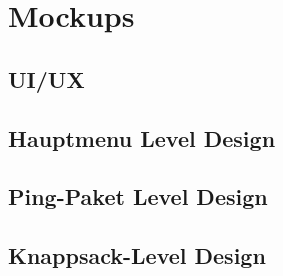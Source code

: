 \chapter{Mockups}

\newcommand*{\checkbox}{{\fboxsep 1pt%
\framebox[1.30\height]{\vphantom{M}\checkmark}}}

\section{UI/UX}

\section{Hauptmenu Level Design}

\section{Ping-Paket Level Design}

\section{Knappsack-Level Design}

